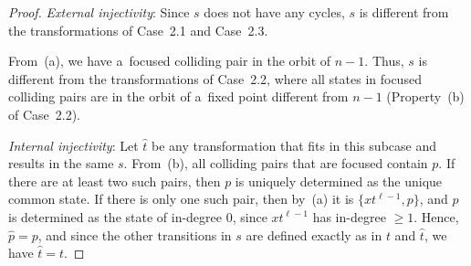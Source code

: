 \documentclass{amsart}
\renewcommand{\ge}{\geqslant}
\newcommand{\e}[1]{\hat{#1}}
\begin{document}
\begin{proof}
\textit{External injectivity}:
Since $s$ does not have any cycles, $s$ is different from the transformations of Case~2.1 and Case~2.3.

From~(a), we have a~focused colliding pair in the orbit of $n-1$. Thus, $s$ is different from the transformations of Case~2.2, where all states in focused colliding pairs are in the orbit of a~fixed point different from $n-1$ (Property~(b) of Case~2.2).

\textit{Internal injectivity}:
Let $\e{t}$ be any transformation that fits in this subcase and results in the same $s$.
From~(b), all colliding pairs that are focused contain $p$.
If there are at least two such pairs, then $p$ is uniquely determined as the unique common state.
If there is only one such pair, then by~(a) it is $\{xt^{\ell-1}, p\}$, and $p$ is determined as the state of in-degree $0$, since $xt^{\ell-1}$ has in-degree $\ge 1$.
Hence, $\e{p} = p$, and since the other transitions in $s$ are defined exactly as in $t$ and $\e{t}$, we have $\e{t} = t$.


\end{proof}
\end{document}
